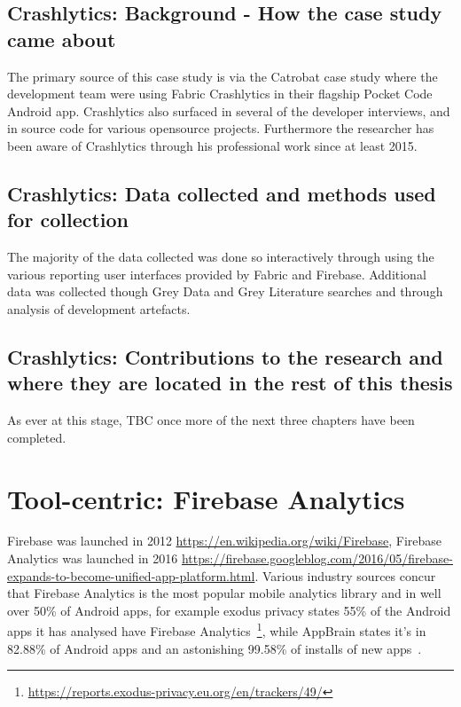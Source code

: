 \subsection{Crashlytics: Background - How the case study came about}
The primary source of this case study is via the Catrobat case study where the development team were using Fabric Crashlytics in their flagship Pocket Code Android app. Crashlytics also surfaced in several of the developer interviews, and in source code for various opensource projects. Furthermore the researcher has been aware of Crashlytics through his professional work since at least 2015.

\subsection{Crashlytics: Data collected and methods used for collection}
The majority of the data collected was done so interactively through using the various reporting user interfaces provided by Fabric and Firebase. Additional data was collected though Grey Data and Grey Literature searches and through analysis of development artefacts.

\subsection{Crashlytics: Contributions to the research and where they are located in the rest of this thesis}
As ever at this stage, TBC once more of the next three chapters have been completed.



\section{Tool-centric: Firebase Analytics} 
Firebase was launched in 2012 \url{https://en.wikipedia.org/wiki/Firebase}, Firebase Analytics was launched in 2016 \url{https://firebase.googleblog.com/2016/05/firebase-expands-to-become-unified-app-platform.html}. Various industry sources concur that Firebase Analytics is the most popular mobile analytics library and in well over 50\% of Android apps, for example exodus privacy states 55\% of the Android apps it has analysed have Firebase Analytics~\footnote{\url{https://reports.exodus-privacy.eu.org/en/trackers/49/}}, while AppBrain states it's in 82.88\% of Android apps and an astonishing 99.58\% of installs of new apps~. 

